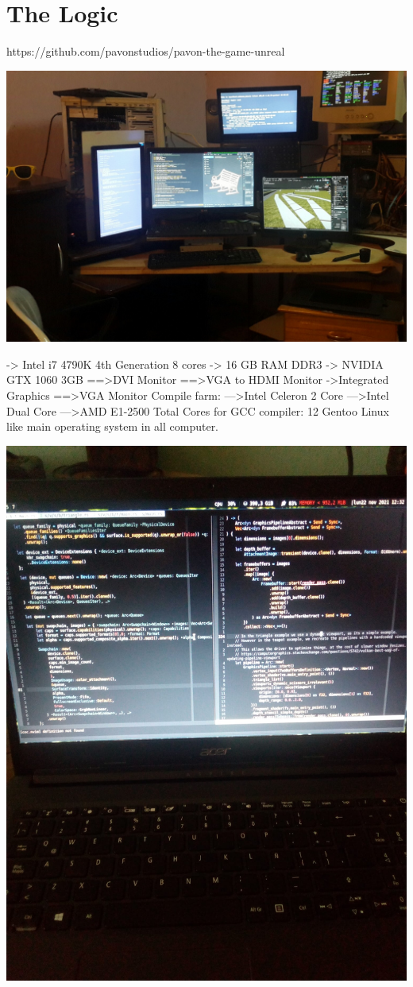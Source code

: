 \documentclass{article}
\begin{document}
  \section{The Logic}

  https://github.com/pavonstudios/pavon-the-game-unreal

  \includegraphics[width=\textwidth]{46.jpg}

  -> Intel i7 4790K 4th Generation 8 cores
-> 16 GB RAM DDR3
-> NVIDIA GTX 1060 3GB
==>DVI Monitor
==>VGA to HDMI Monitor
->Integrated Graphics
==>VGA Monitor
Compile farm:
--->Intel Celeron 2 Core
--->Intel Dual Core
--->AMD E1-2500
Total Cores for GCC compiler: 12
Gentoo Linux like main operating system in all computer.

  \includegraphics[width=\textwidth]{47.jpg}
\end{document}
